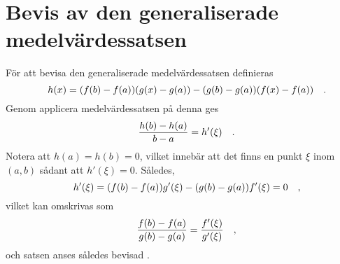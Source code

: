 \section{Bevis av den generaliserade medelvärdessatsen}\label{proof_generalised_mvt}
För att bevisa den generaliserade medelvärdessatsen definieras
\begin{equation*}
    h(x)=(f(b)-f(a))(g(x)-g(a))-(g(b)-g(a))(f(x)-f(a))
\quad\mathrm{.}\!\!\!\!\!\!\end{equation*} Genom applicera medelvärdessatsen på denna ges
\begin{equation}
    \frac{h(b)-h(a)}{b-a}=h'(\xi)
\quad\mathrm{.}\!\!\!\!\!\!\end{equation} Notera att \(h(a)=h(b)=0\), vilket innebär att det finns en punkt \(\xi\) inom \((a, b)\) sådant att \(h'(\xi)=0\). Således,
\begin{equation}
    h'(\xi)=(f(b)-f(a))g'(\xi)-(g(b)-g(a))f'(\xi)=0
\quad\mathrm{,}\!\!\!\!\!\!\end{equation} vilket kan omskrivas som
\begin{equation}
    \frac{f(b)-f(a)}{g(b)-g(a)}=\frac{f'(\xi)}{g'(\xi)}
\quad\mathrm{,}\!\!\!\!\!\!\end{equation} och satsen anses således bevisad \parencite[141-142]{adams_calculus_2010}.

\clearpage

